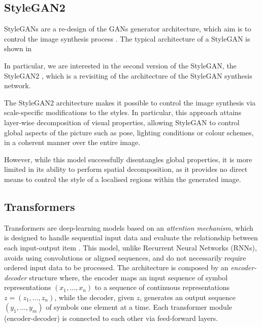 \documentclass{article}
\begin{document}
	\subsection{StyleGAN2}\label{sec:StyleGAN}
	StyleGANs are a re-design of the GANs generator architecture, which aim is to control the image 
	synthesis process \cite{karras2019style}. The typical architecture of a StyleGAN is shown in 
	
	In particular, we are interested in the second version of the StyleGAN, the StyleGAN2 
	\cite{karras2020analyzing}, which is a revisiting of the architecture of the StyleGAN synthesis 
	network. 
	
	The StyleGAN2 architecture makes it possible to control the image synthesis via scale-specific 
	modifications to the styles. In particular, this approach attains layer-wise decomposition of visual 
	properties, allowing StyleGAN to control global aspects of the picture such as pose, lighting 
	conditions or colour schemes, in a coherent manner over the entire image.
	
	However, while this model successfully disentangles global properties, it is more limited in its ability to perform spatial decomposition, as it provides no direct means to control the style of a localised 
	regions within the generated image.
	
	\subsection{Transformers}\label{sec:transformer}
	Transformers are deep-learning models based on an \textit{attention mechanism}, which is 
	designed 
	to handle sequential input data and evaluate the relationship between each input-output item 
	\cite{vaswani2017attention}.
	This model, unlike Recurrent Neural Networks (RNNs), avoids using convolutions or aligned 
	sequences, and do not necessarily require ordered input data to be processed. 
	The architecture is composed by an \textit{encoder-decoder} structure where, the {encoder} maps 
	an input sequence of symbol representations $(x_1,\dots, x_n)$ to a sequence of continuous 
	representations $z = (z_1, \dots, z_n)$, while the  {decoder}, given $z$, generates an output 
	sequence $(y_1, \dots, y_m)$ of symbols one element at a time. 
	Each transformer module (encoder-decoder) is connected to each other via feed-forward
	layers.
	
\end{document}
